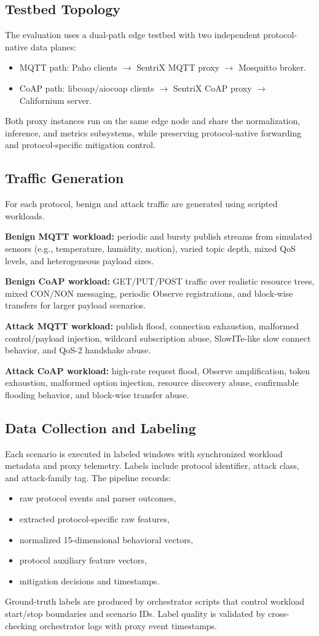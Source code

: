 \documentclass[conference]{IEEEtran}
\begin{document}
\subsection{Testbed Topology}
The evaluation uses a dual-path edge testbed with two independent protocol-native data planes:
\begin{itemize}
\item MQTT path: Paho clients $\rightarrow$ SentriX MQTT proxy $\rightarrow$ Mosquitto broker.
\item CoAP path: libcoap/aiocoap clients $\rightarrow$ SentriX CoAP proxy $\rightarrow$ Californium server.
\end{itemize}
Both proxy instances run on the same edge node and share the normalization, inference, and metrics subsystems, while preserving protocol-native forwarding and protocol-specific mitigation control.

\subsection{Traffic Generation}
For each protocol, benign and attack traffic are generated using scripted workloads.

\textbf{Benign MQTT workload:} periodic and bursty publish streams from simulated sensors (e.g., temperature, humidity, motion), varied topic depth, mixed QoS levels, and heterogeneous payload sizes.

\textbf{Benign CoAP workload:} GET/PUT/POST traffic over realistic resource trees, mixed CON/NON messaging, periodic Observe registrations, and block-wise transfers for larger payload scenarios.

\textbf{Attack MQTT workload:} publish flood, connection exhaustion, malformed control/payload injection, wildcard subscription abuse, SlowITe-like slow connect behavior, and QoS-2 handshake abuse.

\textbf{Attack CoAP workload:} high-rate request flood, Observe amplification, token exhaustion, malformed option injection, resource discovery abuse, confirmable flooding behavior, and block-wise transfer abuse.

\subsection{Data Collection and Labeling}
Each scenario is executed in labeled windows with synchronized workload metadata and proxy telemetry. Labels include protocol identifier, attack class, and attack-family tag. The pipeline records:
\begin{itemize}
\item raw protocol events and parser outcomes,
\item extracted protocol-specific raw features,
\item normalized 15-dimensional behavioral vectors,
\item protocol auxiliary feature vectors,
\item mitigation decisions and timestamps.
\end{itemize}
Ground-truth labels are produced by orchestrator scripts that control workload start/stop boundaries and scenario IDs. Label quality is validated by cross-checking orchestrator logs with proxy event timestamps.
\end{document}
